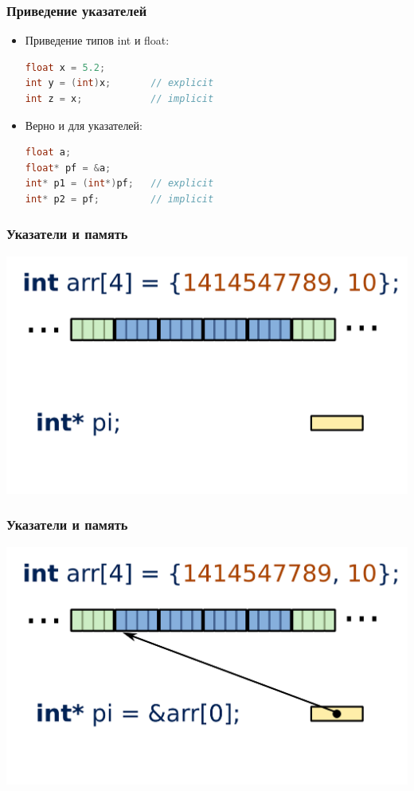 \documentclass[12pt,pdf,hyperref={unicode}]{beamer}
\begin{document}
\begin{frame}[fragile]
\frametitle{Приведение указателей} 
\begin{itemize}
\item Приведение типов int и float: \\
\begin{lstlisting}[language=C++,basicstyle=\ttfamily,keywordstyle=\color{blue}]
float x = 5.2;
int y = (int)x;       // explicit
int z = x;            // implicit
\end{lstlisting}
\item Верно и для указателей: \\
\begin{lstlisting}[language=C++,basicstyle=\ttfamily,keywordstyle=\color{blue}]
float a;
float* pf = &a;
int* p1 = (int*)pf;   // explicit
int* p2 = pf;         // implicit
\end{lstlisting}
\end{itemize}
\end{frame}


\begin{frame}[fragile]
\frametitle{Указатели и память} 
\begin{center}
\includegraphics[width=0.95\linewidth]{images/memory_different_pointers_1.png}
\end{center}
\end{frame}

\begin{frame}[fragile]
\frametitle{Указатели и память} 
\begin{center}
\includegraphics[width=0.95\linewidth]{images/memory_different_pointers_2.png}
\end{center}
\end{frame}
\end{document}
